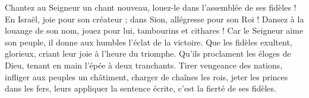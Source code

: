 Chantez au Seigneur un chant nouveau, louez-le dans l'assemblée de ses fidèles !
\versseparator
En Israël, joie pour son créateur ; dans Sion, allégresse pour son Roi !
\versseparator
Dansez à la louange de son nom, jouez pour lui, tambourins et cithares !
\versseparator
Car le Seigneur aime son peuple, il donne aux humbles l'éclat de la victoire.
\versseparator
Que les fidèles exultent, glorieux, criant leur joie à l'heure du triomphe.
\versseparator
Qu'ils proclament les éloges de Dieu, tenant en main l'épée à deux tranchants.
\versseparator
Tirer vengeance des nations, infliger aux peuples un châtiment,
\versseparator
charger de chaînes les rois, jeter les princes dans les fers,
\versseparator
leurs appliquer la sentence écrite, c'est la fierté de ses fidèles.
